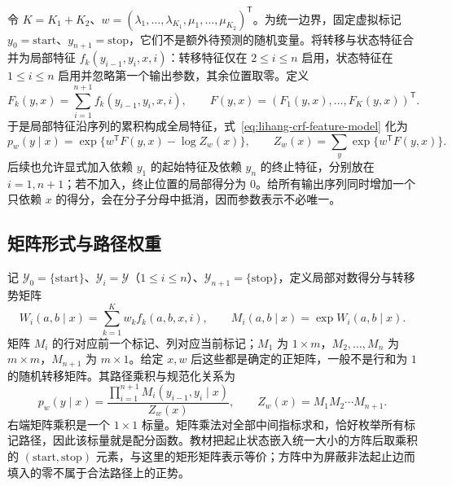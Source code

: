 令 $K=K_1+K_2$、$w=(\lambda_1,\ldots,\lambda_{K_1},\mu_1,\ldots,\mu_{K_2})^{\mathsf T}$。为统一边界，固定虚拟标记 $y_0=\mathrm{start}$、$y_{n+1}=\mathrm{stop}$，它们不是额外待预测的随机变量。将转移与状态特征合并为局部特征 $f_k(y_{i-1},y_i,x,i)$：转移特征仅在 $2\leq i\leq n$ 启用，状态特征在 $1\leq i\leq n$ 启用并忽略第一个输出参数，其余位置取零。定义
\begin{equation}
\label{eq:lihang-crf-global-features}
  F_k(y,x)=\sum_{i=1}^{n+1}f_k(y_{i-1},y_i,x,i),\qquad
  F(y,x)=(F_1(y,x),\ldots,F_K(y,x))^{\mathsf T}.
\end{equation}
于是局部特征沿序列的累积构成全局特征，式~\eqref{eq:lihang-crf-feature-model} 化为
\begin{equation}
\label{eq:lihang-crf-vector-model}
  p_w(y\mid x)=\exp\{w^{\mathsf T}F(y,x)-\log Z_w(x)\},\qquad
  Z_w(x)=\sum_y\exp\{w^{\mathsf T}F(y,x)\}.
\end{equation}
后续也允许显式加入依赖 $y_1$ 的起始特征及依赖 $y_n$ 的终止特征，分别放在 $i=1,n+1$；若不加入，终止位置的局部得分为 $0$。给所有输出序列同时增加一个只依赖 $x$ 的得分，会在分子分母中抵消，因而参数表示不必唯一。

\subsection{矩阵形式与路径权重}
\label{subsec:lihang-crf-matrix}

记 $\mathcal Y_0=\{\mathrm{start}\}$、$\mathcal Y_i=\mathcal Y$（$1\leq i\leq n$）、$\mathcal Y_{n+1}=\{\mathrm{stop}\}$，定义局部对数得分与转移势矩阵
\begin{equation}
\label{eq:lihang-crf-matrices}
  W_i(a,b\mid x)=\sum_{k=1}^K w_kf_k(a,b,x,i),\qquad
  M_i(a,b\mid x)=\exp W_i(a,b\mid x).
\end{equation}
矩阵 $M_i$ 的行对应前一个标记、列对应当前标记；$M_1$ 为 $1\times m$，$M_2,\ldots,M_n$ 为 $m\times m$，$M_{n+1}$ 为 $m\times1$。给定 $x,w$ 后这些都是确定的正矩阵，一般不是行和为 $1$ 的随机转移矩阵。其路径乘积与规范化关系为
\begin{equation}
\label{eq:lihang-crf-matrix-product}
  p_w(y\mid x)=\frac{\displaystyle\prod_{i=1}^{n+1}M_i(y_{i-1},y_i\mid x)}{Z_w(x)},\qquad
  Z_w(x)=M_1M_2\cdots M_{n+1}.
\end{equation}
右端矩阵乘积是一个 $1\times1$ 标量。矩阵乘法对全部中间指标求和，恰好枚举所有标记路径，因此该标量就是配分函数。教材把起止状态嵌入统一大小的方阵后取乘积的 $(\mathrm{start},\mathrm{stop})$ 元素，与这里的矩形矩阵表示等价；方阵中为屏蔽非法起止边而填入的零不属于合法路径上的正势。

